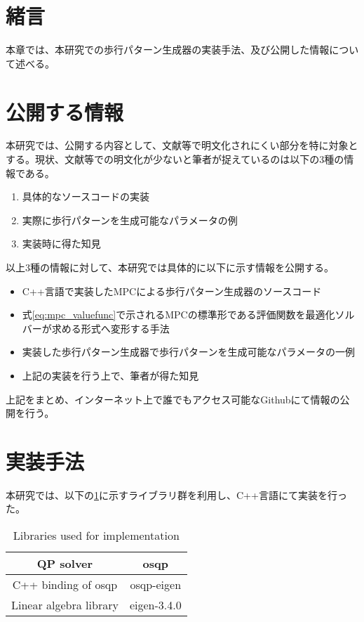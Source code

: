 \section{緒言}
本章では、本研究での歩行パターン生成器の実装手法、及び公開した情報について述べる。

\section{公開する情報}
本研究では、公開する内容として、文献等で明文化されにくい部分を特に対象とする。現状、文献等での明文化が少ないと筆者が捉えているのは以下の3種の情報である。
\begin{enumerate}
  \item 具体的なソースコードの実装
  \item 実際に歩行パターンを生成可能なパラメータの例
  \item 実装時に得た知見
\end{enumerate}

以上3種の情報に対して、本研究では具体的に以下に示す情報を公開する。

\begin{itemize}
  \item C++言語で実装したMPCによる歩行パターン生成器のソースコード
  \item 式\eqref{eq:mpc_valuefunc}で示されるMPCの標準形である評価関数を最適化ソルバーが求める形式へ変形する手法
  \item 実装した歩行パターン生成器で歩行パターンを生成可能なパラメータの一例
  \item 上記の実装を行う上で、筆者が得た知見
\end{itemize}

上記をまとめ、インターネット上で誰でもアクセス可能なGithub\cite{MYGITHUB}にて情報の公開を行う。

\section{実装手法}

本研究では、以下の\ref{tb:library}に示すライブラリ群を利用し、C++言語にて実装を行った。

\begin{table}[htbp]
  \centering
  \begin{tabular}{|c|c|} \hline
    QP solver              & osqp\cite{OSQP}            \\ \hline
    C++ binding of osqp    & osqp-eigen\cite{OSQPEIGEN} \\ \hline
    Linear algebra library & eigen-3.4.0\cite{EIGEN}    \\ \hline
  \end{tabular}
  \caption{Libraries used for implementation}
  \label{tb:library}
\end{table}


